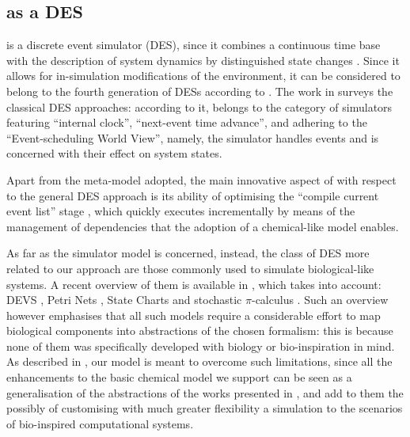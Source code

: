 \documentclass[12pt,a4paper,twoside,openright]{book}
\begin{document}
\subsection{\alchemist{} as a DES}

\alchemist{} is a discrete event simulator (DES), since it combines a continuous time base with the description of system dynamics by distinguished state changes \cite{Zeigler2000}.
%
Since it allows for in-simulation modifications of the environment, it can be considered to belong to the fourth generation of DESs according to \cite{BabulakIJOE2008}.
%
The work in \cite{Pollacia89} surveys the classical DES approaches: according to it, \alchemist{} belongs to the category of simulators featuring ``internal clock'', ``next-event time advance'', and adhering to the ``Event-scheduling World View'', namely, the simulator handles events and is concerned with their effect on system states.

Apart from the meta-model adopted, the main innovative aspect of \alchemist{} with respect to the general DES approach is its ability of optimising the ``compile current event list'' stage \cite{Pollacia89}, which \alchemist{} quickly executes incrementally by means of the management of dependencies that the adoption of a chemical-like model enables.

As far as the simulator model is concerned, instead, the class of DES more related to our approach are those commonly used to simulate biological-like systems.
%
A recent overview of them is available in \cite{EwaldJOS2007}, which takes into account: DEVS \cite{zeigler1984}, Petri Nets \cite{murata1989}, State Charts \cite{Harel1987} and stochastic $\pi$-calculus \cite{Priami1995}.
%
Such an overview however emphasises that all such models require a considerable effort to map biological components into abstractions of the chosen formalism: this is because none of them was specifically developed with biology or bio-inspiration in mind.
%
As described in , our model is meant to overcome such limitations, since all the enhancements to the basic chemical model we support can be seen as a generalisation of the abstractions of the works presented in \cite{EwaldJOS2007}, and add to them the possibly of customising with much greater flexibility a simulation to the scenarios of bio-inspired computational systems.
\end{document}
